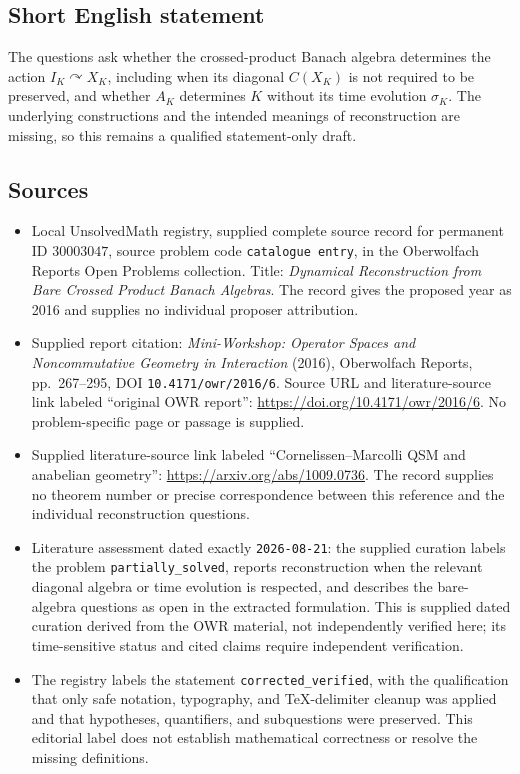 \documentclass[11pt]{article}
\begin{document}
\subsection{Short English statement}
The questions ask whether the crossed-product Banach algebra determines the action \(I_K\curvearrowright X_K\), including when its diagonal \(C(X_K)\) is not required to be preserved, and whether \(A_K\) determines \(K\) without its time evolution \(\sigma_K\). The underlying constructions and the intended meanings of reconstruction are missing, so this remains a qualified statement-only draft.
\subsection{Sources}
\begin{itemize}
\item Local UnsolvedMath registry, supplied complete source record for permanent ID \(30003047\), source problem code \texttt{catalogue entry}, in the Oberwolfach Reports Open Problems collection. Title: \emph{Dynamical Reconstruction from Bare Crossed Product Banach Algebras}. The record gives the proposed year as 2016 and supplies no individual proposer attribution.
\item Supplied report citation: \emph{Mini-Workshop: Operator Spaces and Noncommutative Geometry in Interaction} (2016), Oberwolfach Reports, pp.~267--295, DOI \texttt{10.4171/owr/2016/6}. Source URL and literature-source link labeled ``original OWR report'': \url{https://doi.org/10.4171/owr/2016/6}. No problem-specific page or passage is supplied.
\item Supplied literature-source link labeled ``Cornelissen--Marcolli QSM and anabelian geometry'': \url{https://arxiv.org/abs/1009.0736}. The record supplies no theorem number or precise correspondence between this reference and the individual reconstruction questions.
\item Literature assessment dated exactly \texttt{2026-08-21}: the supplied curation labels the problem \texttt{partially\_solved}, reports reconstruction when the relevant diagonal algebra or time evolution is respected, and describes the bare-algebra questions as open in the extracted formulation. This is supplied dated curation derived from the OWR material, not independently verified here; its time-sensitive status and cited claims require independent verification.
\item The registry labels the statement \texttt{corrected\_verified}, with the qualification that only safe notation, typography, and TeX-delimiter cleanup was applied and that hypotheses, quantifiers, and subquestions were preserved. This editorial label does not establish mathematical correctness or resolve the missing definitions.
\end{itemize}
\end{document}

